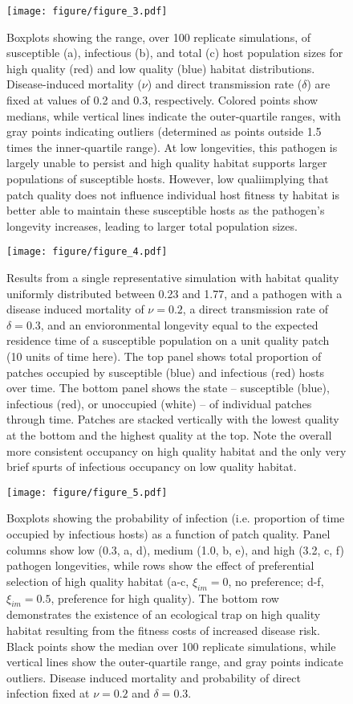 \documentclass{article}
\begin{document}
\begin{figure}
\texttt{[image: figure/figure\_3.pdf]}
\centering
\caption{Boxplots showing the range, over 100 replicate simulations, of susceptible (a), infectious (b), and total (c) host population sizes for high quality (red) and low quality (blue) habitat distributions.  Disease-induced mortality ($\nu$) and direct transmission rate ($\delta$) are fixed at values of 0.2 and 0.3, respectively.  Colored points show medians, while vertical lines indicate the outer-quartile ranges, with gray points indicating outliers (determined as points outside 1.5 times the inner-quartile range).  At low longevities, this pathogen is largely unable to persist and high quality habitat supports larger populations of susceptible hosts.  However, low qualiimplying that patch quality does not influence individual host fitness ty habitat is better able to maintain these susceptible hosts as the pathogen's longevity increases, leading to larger total population sizes.}
\label{popsizes}
\end{figure}

\begin{figure}
\texttt{[image: figure/figure\_4.pdf]}
\centering
\caption{Results from a single representative simulation with habitat quality uniformly distributed between 0.23 and 1.77, and a pathogen with a disease induced mortality of $\nu = 0.2$, a direct transmission rate of $\delta = 0.3$, and an envioronmental longevity equal to the expected residence time of a susceptible population on a unit quality patch (10 units of time here).  The top panel shows total proportion of patches occupied by susceptible (blue) and infectious (red) hosts over time.  The bottom panel shows the state -- susceptible (blue), infectious (red), or unoccupied (white) -- of individual patches through time.  Patches are stacked vertically with the lowest quality at the bottom and the highest quality at the top.  Note the overall more consistent occupancy on high quality habitat and the only very brief spurts of infectious occupancy on low quality habitat.}
\label{simvis}
\end{figure}


\begin{figure}
\texttt{[image: figure/figure\_5.pdf]}
\centering
\caption{Boxplots showing the probability of infection (i.e. proportion of time occupied by infectious hosts) as a function of patch quality.  Panel columns show low (0.3, a, d), medium (1.0, b, e), and high (3.2, c, f) pathogen longevities, while rows show the effect of preferential selection of high quality habitat (a-c, $\xi_{im} = 0$,  no preference; d-f, $\xi_{im} = 0.5$, preference for high quality). The bottom row demonstrates the existence of an ecological trap on high quality habitat resulting from the fitness costs of increased disease risk. Black points show the median over 100 replicate simulations, while vertical lines show the outer-quartile range, and gray points indicate outliers. Disease induced mortality and probability of direct infection fixed at $\nu = 0.2$ and $\delta = 0.3$.}
\label{pinfection}
\end{figure}
\end{document}

